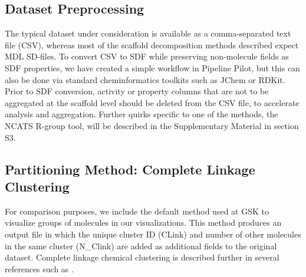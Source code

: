 \documentclass[journal=jacsat,biochem,manuscript=article]{achemso}
\begin{document}
\subsection{Dataset Preprocessing}
\label{sec:prepro}
The typical dataset under consideration is available as a
comma-separated text file (CSV), whereas most of the scaffold
decomposition methods described expect MDL SD-files. To convert CSV to
SDF while preserving non-molecule fields as SDF properties, we have
created a simple workflow in Pipeline Pilot\cite{PPilot}, but this can also be done
via standard cheminformatics toolkits such as JChem\cite{JChem} or RDKit\cite{RDKit}. Prior to
SDF conversion, activity or property columns that are not to be
aggregated at the scaffold level should be deleted from the CSV file,
to accelerate analysis and aggregation.  Further quirks specific to one of the methods, the NCATS R-group tool,
will be described in the Supplementary Material in section S3.

\subsection{Partitioning Method: Complete Linkage Clustering}
For comparison purposes, we include the default method used at GSK to visualize groups of
molecules in our visualizations. This
method produces an output file in which the unique cluster ID (CLink)
and number of other molecules in the same cluster (N\_Clink) are added
as additional fields to the original dataset.  Complete linkage
chemical clustering is described further in several references such
as \citet{Jain2010,Downs2003}.
\end{document}
